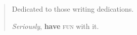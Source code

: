 \hspace{0pt}\vfill

\begin{quote}
    Dedicated to those writing dedications.
    
    \emph{Seriously}, \textbf{have} \textsc{fun} \hfill with it.
\end{quote}

\vfill\hspace{0pt}